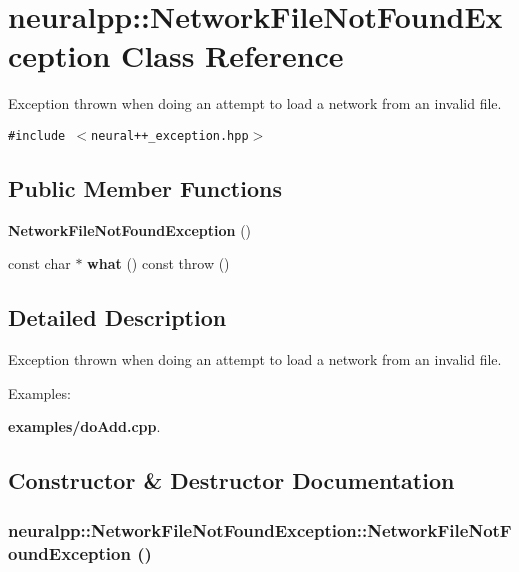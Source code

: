 \section{neuralpp::NetworkFileNotFoundException Class Reference}
\label{classneuralpp_1_1NetworkFileNotFoundException}
Exception thrown when doing an attempt to load a network from an invalid file.  


{\tt \#include $<$neural++\_\-exception.hpp$>$}

\subsection*{Public Member Functions}
\begin{CompactItemize}
\item 
{\bf NetworkFileNotFoundException} ()
\item 
const char $\ast$ {\bf what} () const   throw ()
\end{CompactItemize}


\subsection{Detailed Description}
Exception thrown when doing an attempt to load a network from an invalid file. \begin{Desc}
\item[Examples: ]\par


{\bf examples/doAdd.cpp}.\end{Desc}


\subsection{Constructor \& Destructor Documentation}
\subsubsection[NetworkFileNotFoundException]{\setlength{\rightskip}{0pt plus 5cm}neuralpp::NetworkFileNotFoundException::NetworkFileNotFoundException ()\hspace{0.3cm}{\tt  [inline]}}\label{classneuralpp_1_1NetworkFileNotFoundException_9603eebdb841f06c9b1007e65cba60f6}




